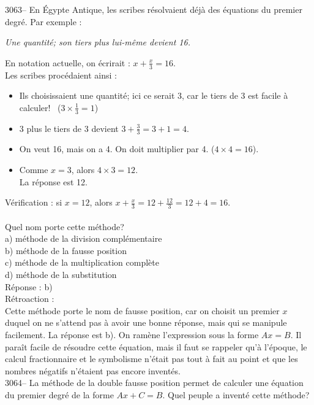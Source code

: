 \documentclass[letterpaper, 12pt]{article}
\begin{document}
3063-- En \'Egypte Antique, les scribes r\'esolvaient d\'ej\`a des \'equations du premier degr\'e. Par exemple :
\begin{center}
\og \emph{Une quantit\'e; son tiers plus lui-m\^eme devient 16.} \fg\\
\end{center}
En notation actuelle, on \'ecrirait : $x + \frac{x}{3} = 16$.\\[2mm]
Les scribes proc\'edaient ainsi :\\
\begin{itemize}
\item Ils choisissaient une quantit\'e; ici ce serait 3, car le tiers de 3 est facile \`a calculer! \ ($3\times \frac{1}{3} = 1$)
\item 3 plus le tiers de 3 devient $3 + \frac{3}{3} = 3 + 1 = 4$.
\item On veut 16, mais on a 4. On doit multiplier par 4. ($4 \times 4 = 16$).
\item Comme $x = 3$, alors $4 \times 3 = 12$.\\
La r\'eponse est 12.
\end{itemize}
V\'erification : si $x = 12$, alors $x + \frac{x}{3} = 12 + \frac{12}{3} = 12 + 4 = 16$.\\
\\
Quel nom porte cette m\'ethode?\\

a) m\'ethode de la division compl\'ementaire\\
b) m\'ethode de la fausse position\\
c) m\'ethode de la multiplication compl\`ete\\
d) m\'ethode de la substitution\\

R\'eponse : b)\\

R\'etroaction :\\
Cette m\'ethode porte le nom de fausse position, car on choisit un premier $x$ duquel on ne s'attend pas \`a avoir une bonne r\'eponse, mais qui se manipule facilement. La r\'eponse est b). On ram\`ene l'expression sous la forme $Ax = B$. Il para\^it facile de r\'esoudre cette \'equation, mais il faut se rappeler qu'\`a l'\'epoque, le calcul fractionnaire et le symbolisme n'\'etait pas tout \`a fait au point et que les nombres n\'egatifs n'\'etaient pas encore invent\'es.\\



3064-- La m\'ethode de la double fausse position permet de calculer une \'equation du premier degr\'e de la forme $Ax + C = B$. Quel peuple a invent\'e cette m\'ethode?\\
\end{document}
